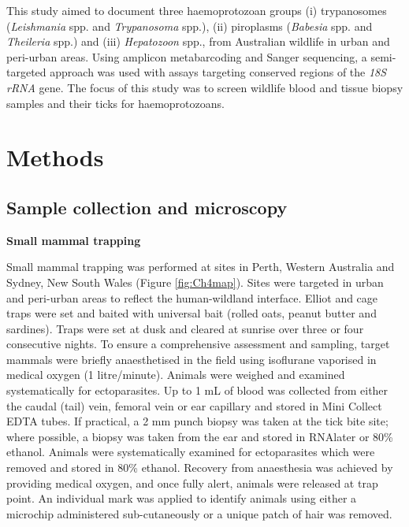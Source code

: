 \documentclass[a4paper, nobind]{templates/ociamthesis}
\begin{document}
This study aimed to document three haemoprotozoan groups (i) trypanosomes (\emph{Leishmania} spp. and \emph{Trypanosoma} spp.), (ii) piroplasms (\emph{Babesia} spp. and \emph{Theileria} spp.) and (iii) \emph{Hepatozoon} spp., from Australian wildlife in urban and peri-urban areas.
Using amplicon metabarcoding and Sanger sequencing, a semi-targeted approach was used with assays targeting conserved regions of the \emph{18S rRNA} gene.
The focus of this study was to screen wildlife blood and tissue biopsy samples and their ticks for haemoprotozoans.

\hypertarget{methods-2}{%
\section{Methods}\label{methods-2}}

\hypertarget{sample-collection-and-microscopy}{%
\subsection{Sample collection and microscopy}\label{sample-collection-and-microscopy}}

\textbf{Small mammal trapping}

Small mammal trapping was performed at sites in Perth, Western Australia and Sydney, New South Wales (Figure \ref{fig:Ch4map}).
Sites were targeted in urban and peri-urban areas to reflect the human-wildland interface.
Elliot and cage traps were set and baited with universal bait (rolled oats, peanut butter and sardines).
Traps were set at dusk and cleared at sunrise over three or four consecutive nights.
To ensure a comprehensive assessment and sampling, target mammals were briefly anaesthetised in the field using isoflurane vaporised in medical oxygen (1 litre/minute).
Animals were weighed and examined systematically for ectoparasites.
Up to 1 mL of blood was collected from either the caudal (tail) vein, femoral vein or ear capillary and stored in Mini Collect EDTA tubes.
If practical, a 2 mm punch biopsy was taken at the tick bite site; where possible, a biopsy was taken from the ear and stored in RNAlater or 80\% ethanol.
Animals were systematically examined for ectoparasites which were removed and stored in 80\% ethanol.
Recovery from anaesthesia was achieved by providing medical oxygen, and once fully alert, animals were released at trap point.
An individual mark was applied to identify animals using either a microchip administered sub-cutaneously or a unique patch of hair was removed.
\end{document}
